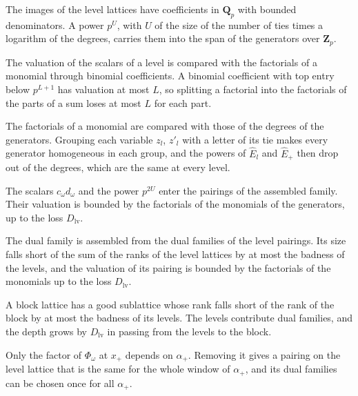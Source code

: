 The images of the level lattices have coefficients in $\mathbf Q_p$ with bounded denominators. A power $p^U$, with
$U$ of the size of the number of ties times a logarithm of the degrees, carries them into the span of the
generators over $\mathbf Z_p$.

The valuation of the scalars of a level is compared with the factorials of a monomial through binomial
coefficients. A binomial coefficient with top entry below $p^{L+1}$ has valuation at most $L$, so splitting a
factorial into the factorials of the parts of a sum loses at most $L$ for each part.

The factorials of a monomial are compared with those of the degrees of the generators. Grouping each
variable $z_l$, $z'_l$ with a letter of its tie makes every generator homogeneous in each group, and the
powers of $\hat E_l$ and $\hat E_+$ then drop out of the degrees, which are the same at every level.

The scalars $c_\omega d_\omega$ and the power $p^{2U}$ enter the pairings of the assembled family. Their valuation
is bounded by the factorials of the monomials of the generators, up to the loss $D_{\mathrm{lv}}$.

The dual family is assembled from the dual families of the level pairings. Its size falls short of the
sum of the ranks of the level lattices by at most the badness of the levels, and the valuation of its
pairing is bounded by the factorials of the monomials up to the loss $D_{\mathrm{lv}}$.

A block lattice has a good sublattice whose rank falls short of the rank of the block by at most the
badness of its levels. The levels contribute dual families, and the depth grows by $D_{\mathrm{lv}}$ in
passing from the levels to the block.

Only the factor of $\Phi_\omega$ at $x_+$ depends on $\alpha_+$. Removing it gives a pairing on the level lattice that
is the same for the whole window of $\alpha_+$, and its dual families can be chosen once for all $\alpha_+$.

